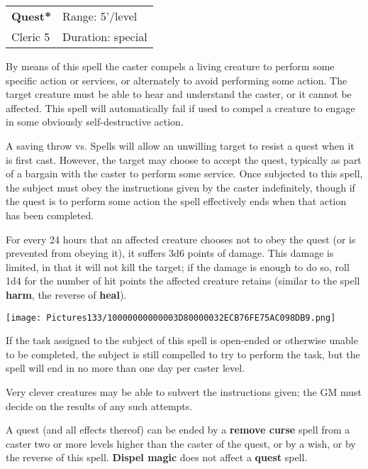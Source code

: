 \documentclass[a4paper,twoside,openany,10pt]{book}
\begin{document}
\begin{multicols}{2}
\smallskip\begin{flushleft} 
	\begin{tabularx}{0.45\textwidth}{@{}m{3.5cm}m{5.5cm}@{}} 
		\textbf{Quest*} & Range: 5'/level\\
Cleric 5 &Duration: special\\
	\end{tabularx}\end{flushleft}

By means of this spell the caster compels a living creature to perform some specific action or services, or alternately to avoid performing some action. The target creature must be able to hear and understand the caster, or it cannot be affected. This spell will automatically fail if used to compel a creature to engage in some obviously self-destructive action.

A saving throw vs. Spells will allow an unwilling target to resist a quest when it is first cast. However, the target may choose to accept the quest, typically as part of a bargain with the caster to perform some service. Once subjected to this spell, the subject must obey the instructions given by the caster indefinitely, though if the quest is to perform some action the spell effectively ends when that action has been completed.

For every 24 hours that an affected creature chooses not to obey the quest (or is prevented from obeying it), it suffers 3d6 points of damage. This damage is limited, in that it will not kill the target; if the damage is enough to do so, roll 1d4 for the number of hit points the affected creature retains (similar to the spell \textbf{harm}, the reverse of \textbf{heal}).


\begin{flushleft}
	\texttt{[image: Pictures133/10000000000003D80000032ECB76FE75AC098DB9.png]}
\end{flushleft}

If the task assigned to the subject of this spell is open-ended or otherwise unable to be completed, the subject is still compelled to try to perform the task, but the spell will end in no more than one day per caster level.

Very clever creatures may be able to subvert the instructions given; the GM must decide on the results of any such attempts.

A quest (and all effects thereof) can be ended by a \textbf{remove curse} spell from a caster two or more levels higher than the caster of the quest, or by a wish, or by the reverse of this spell. \textbf{Dispel magic} does not affect a \textbf{quest }spell.




\end{multicols}
\end{document}
